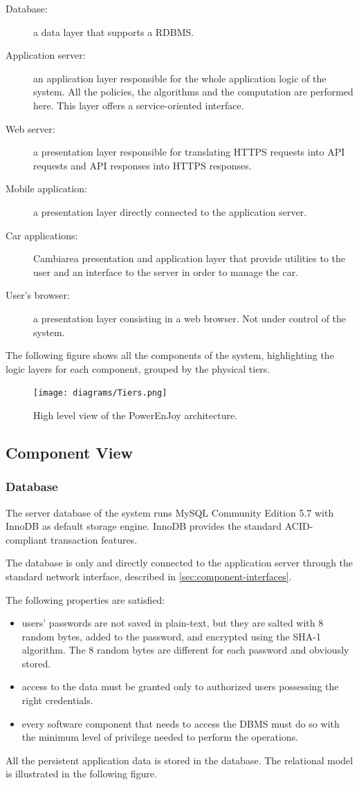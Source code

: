 \begin{description}
	\item[Database:] a data layer that supports a RDBMS.
	\item[Application server:] an application layer responsible for the whole application logic of the system. All the policies, the algorithms and the computation are performed here. This layer offers a service-oriented interface.
	\item[Web server:] a presentation layer responsible for translating HTTPS requests into API requests and API responses into HTTPS responses. 
	\item[Mobile application:] a presentation layer directly connected to the application server.
	\item[Car applications:] Cambiarea presentation and application layer that provide utilities to the user and an interface to the server in order to manage the car.
	\item[User's browser:] a presentation layer consisting in a web browser. Not under control of the system.
\end{description}
The following figure shows all the components of the system, highlighting the logic layers for each component, grouped by the physical tiers.

\begin{figure}[H]
	\centering
	\texttt{[image: diagrams/Tiers.png]}
	\caption{High level view of the PowerEnJoy architecture.}
	\label {fig:tiers}
\end{figure}

\subsection{Component View}

\subsubsection{Database}

The server database of the system runs MySQL Community Edition 5.7 with InnoDB as default storage engine. InnoDB provides the standard ACID-compliant transaction features.

The database is only and directly connected to the application server through the standard network interface, described in \autoref{sec:component-interfaces}.

The following properties are satisfied:
\begin{itemize}
	\item users' passwords are not saved in plain-text, but they are salted with 8 random bytes, added to the password, and encrypted using the SHA-1 algorithm. The 8 random bytes are different for each password and obviously stored.
	\item access to the data must be granted only to authorized users possessing the right credentials.
	\item every software component that needs to access the DBMS must do so with the minimum level of privilege needed to perform the operations.
\end{itemize}
All the persistent application data is stored in the database. The relational model is illustrated in the following figure.

